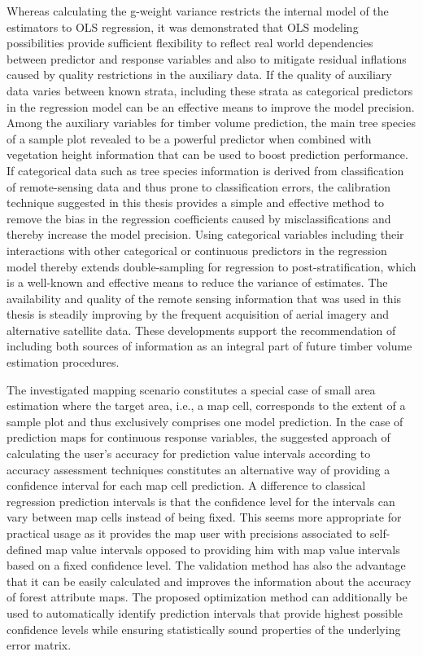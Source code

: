 Whereas calculating the g-weight variance restricts the internal model of the estimators to OLS regression, it was demonstrated that OLS modeling possibilities provide sufficient flexibility to reflect real world dependencies between predictor and response variables and also to mitigate residual inflations caused by quality restrictions in the auxiliary data. If the quality of auxiliary data varies between known strata, including these strata as categorical predictors in the regression model can be an effective means to improve the model precision. Among the auxiliary variables for timber volume prediction, the main tree species of a sample plot revealed to be a powerful predictor when combined with vegetation height information that can be used to boost prediction performance. If categorical data such as tree species information is derived from classification of remote-sensing data and thus prone to classification errors, the calibration technique suggested in this thesis provides a simple and effective method to remove the bias in the regression coefficients caused by misclassifications and thereby increase the model precision. Using categorical variables including their interactions with other categorical or continuous predictors in the regression model thereby extends double-sampling for regression to post-stratification, which is a well-known and effective means to reduce the variance of estimates. The availability and quality of the remote sensing information that was used in this thesis is steadily improving by the frequent acquisition of aerial imagery and alternative satellite data. These developments support the recommendation of including both sources of information as an integral part of future timber volume estimation procedures.\par

The investigated mapping scenario constitutes a special case of small area estimation where the target area, i.e., a map cell, corresponds to the extent of a sample plot and thus exclusively comprises one model prediction. In the case of prediction maps for continuous response variables, the suggested approach of calculating the user's accuracy for prediction value intervals according to accuracy assessment techniques constitutes an alternative way of providing a confidence interval for each map cell prediction. A difference to classical regression prediction intervals is that the confidence level for the intervals can vary between map cells instead of being fixed. This seems more appropriate for practical usage as it provides the map user with precisions associated to self-defined map value intervals opposed to providing him with map value intervals based on a fixed confidence level. The validation method has also the advantage that it can be easily calculated and improves the information about the accuracy of forest attribute maps. The proposed optimization method can additionally be used to automatically identify prediction intervals that provide highest possible confidence levels while ensuring statistically sound properties of the underlying error matrix.  

